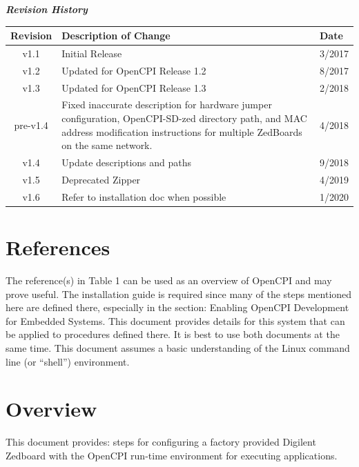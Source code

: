 \begin{center}
	\textit{\textbf{Revision History}}
	\begin{table}[H]
		\label{table:revisions} %
		\begin{tabularx}{\textwidth}{|c|X|l|}
			\hline
			\rowcolor{blue}
			\textbf{Revision} & \textbf{Description of Change} & \textbf{Date} \\
			\hline
			v1.1 & Initial Release & 3/2017 \\
			\hline
			v1.2 & Updated for OpenCPI Release 1.2 & 8/2017 \\
			\hline
			v1.3 & Updated for OpenCPI Release 1.3 & 2/2018 \\
			\hline
			pre-v1.4 & Fixed inaccurate description for hardware jumper configuration, OpenCPI-SD-zed directory path, and MAC address modification instructions for multiple ZedBoards on the same network. & 4/2018 \\
			\hline
			v1.4 & Update descriptions and paths & 9/2018 \\
			\hline
			v1.5 & Deprecated Zipper & 4/2019 \\
			\hline
			v1.6 & Refer to installation doc when possible & 1/2020 \\
	        \hline
		\end{tabularx}
	\end{table}
\end{center}
\newpage

\tableofcontents
\newpage

\section{References}
The reference(s) in Table 1 can be used as an overview of OpenCPI and may prove useful.  The installation guide is required since many of the steps mentioned here are defined there, especially in the section:  Enabling OpenCPI Development for Embedded Systems.  This document provides details for this system that can be applied to procedures defined there.  It is best to use both documents at the same time.  This document assumes a basic understanding of the Linux command line (or ``shell'') environment.  
\def\refcapbottom{}

\section{Overview}
This document provides: steps for configuring a factory provided Digilent Zedboard with the OpenCPI run-time environment for executing applications.

